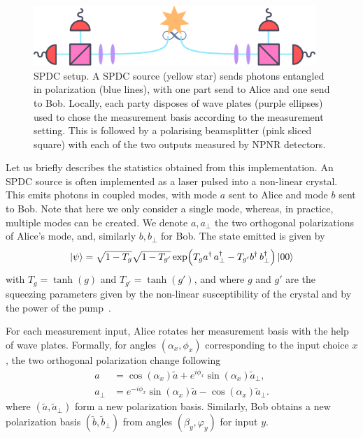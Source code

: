 \begin{figure}[t]
	\begin{center}
		\includegraphics[width=0.95\textwidth]{chapters/deviceindependent/img/spdc.pdf}
	\end{center}
	\caption{SPDC setup. A SPDC source (yellow star) sends photons entangled in polarization (blue lines), with one part send to Alice and one send to Bob.
	Locally, each party disposes of wave plates (purple ellipses) used to chose the measurement basis according to the measurement setting. This is followed by a polarising beamsplitter (pink sliced square) with each of the two outputs measured by NPNR detectors.}
	\label{fig:spdc}
\end{figure}

\medbreak

Let us briefly describes the statistics obtained from this implementation.
An SPDC source is often implemented as a laser pulsed into a non-linear crystal.
This emits photons in coupled modes, with mode $a$ sent to Alice and mode $b$ sent to Bob.
Note that here we only consider a single mode, whereas, in practice, multiple modes can be created.
We denote $a,a_\perp$ the two orthogonal polarizations of Alice's mode, and, similarly $b,b_\perp$ for Bob.
The state emitted is given by
\begin{equation}
	\ket{\psi} = \sqrt{1-T_g}\sqrt{1-T_{g'}}\exp(T_{g} a^\dag\,a^\dag_\perp - T_{g'}b^\dag\,b_\perp^\dag)\ket{00}
\end{equation}
with $T_g = \tanh(g)$ and $T_{g'} = \tanh(g')$, and where $g$ and $g'$ are the squeezing parameters given by the non-linear susceptibility of the crystal and by the power of the pump~\cite{Vivoli2015b}.

For each measurement input, Alice rotates her measurement basis with the help of wave plates.
Formally, for angles $(\alpha_x,\phi_x)$ corresponding to the input choice $x$, the two orthogonal polarization change following
\begin{equation}
	\begin{split}
		a &= \cos(\alpha_x)\tilde{a} + e^{i\phi_x}\sin(\alpha_x)\tilde{a}_\perp, \\
		a_\perp &= e^{-i\phi_x}\sin(\alpha_x)\tilde{a}-\cos(\alpha_x)\tilde{a}_\perp.
	\end{split}
\end{equation}
where $(\tilde{a},\tilde{a}_\perp)$ form a new polarization basis.
Similarly, Bob obtains a new polarization basis $(\tilde{b},\tilde{b}_\perp)$ from angles $(\beta_y,\varphi_y)$ for input $y$.

